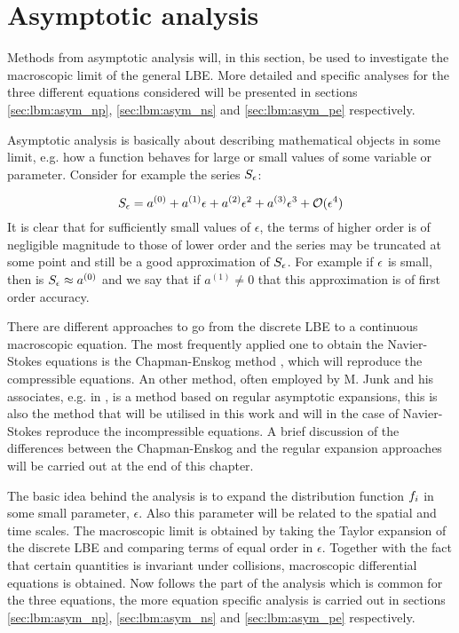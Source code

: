 \section{Asymptotic analysis}\label{sec:lbm:asym}
Methods from asymptotic analysis will, in this section, be used to
investigate the macroscopic limit of the general LBE. More detailed and
specific analyses for the three different equations considered will be
presented in sections \ref{sec:lbm:asym_np}, \ref{sec:lbm:asym_ns} and
\ref{sec:lbm:asym_pe} respectively. 

Asymptotic analysis is basically about describing mathematical objects
in some limit, e.g. how a function behaves for large or small values
of some variable or parameter. Consider for example the series $S_{\epsilon}$:

\begin{equation}
S_{\epsilon} = a^{(0)} + a^{(1)}\epsilon + a^{(2)}\epsilon^2 +
a^{(3)}\epsilon^3 + \mathcal{O}(\epsilon^4)
\end{equation}
It is clear that for sufficiently small values of $\epsilon$, the
terms of higher order is of negligible magnitude to those of lower
order and the series may be truncated at some point and still be a
good approximation of $S_{\epsilon}$. For example if $\epsilon$ is small, then
is $S_{\epsilon} \approx a^{(0)}$ and we say that if $a^{(1)} \neq 0$ that
this approximation is of first order accuracy.

There are different approaches to go from the discrete LBE to a
continuous macroscopic equation. The most frequently applied one to
obtain the Navier-Stokes equations is the Chapman-Enskog method
\cite{junk-boundary}, which will reproduce the compressible
equations. An other method, often employed by M. Junk and his
associates, e.g. in \cite{junk-asym}, is a method based on regular
asymptotic expansions, this is also the method that will be utilised
in this work and will in the case of Navier-Stokes reproduce the
incompressible equations. A brief discussion of the differences
between the Chapman-Enskog and the regular expansion approaches will
be carried out at the end of this chapter.

The basic idea behind the analysis is to expand the distribution
function $f_i$ in some small parameter, $\epsilon$. Also this
parameter will be related to the spatial and time scales. The
macroscopic limit is obtained by taking the Taylor expansion of the
discrete LBE and comparing terms of equal order in
$\epsilon$. Together with the fact that certain quantities is
invariant under collisions, macroscopic differential equations is
obtained. Now follows the part of the analysis which is common for the
three equations, the more equation specific analysis is carried out in
sections \ref{sec:lbm:asym_np}, \ref{sec:lbm:asym_ns} and
\ref{sec:lbm:asym_pe} respectively.

